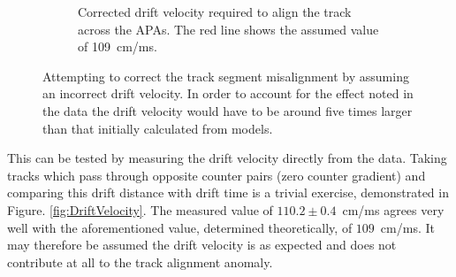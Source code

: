 \begin{figure}
\begin{subfigure}[t]{0.48\linewidth}
    \caption{Corrected drift velocity required to align the track across the APAs.  The red line shows the assumed value of 109~cm/ms.}
    \label{fig:TrackMisalignmentDriftVelocityRes}
  \end{subfigure}
  \caption[Attempting to correct the track segment misalignment by assuming an incorrect drift velocity.]{Attempting to correct the track segment misalignment by assuming an incorrect drift velocity.  In order to account for the effect noted in the data the drift velocity would have to be around five times larger than that initially calculated from models.}
  \label{fig:TrackMisalignmentDriftVelocity}
\end{figure}

This can be tested by measuring the drift velocity directly from the data.  Taking tracks which pass through opposite counter pairs (zero counter gradient) and comparing this drift distance with drift time is a trivial exercise, demonstrated in Figure. \ref{fig:DriftVelocity}.  The measured value of $110.2\pm0.4$~cm/ms agrees very well with the aforementioned value, determined theoretically, of $109$~cm/ms.  It may therefore be assumed the drift velocity is as expected and does not contribute at all to the track alignment anomaly.

